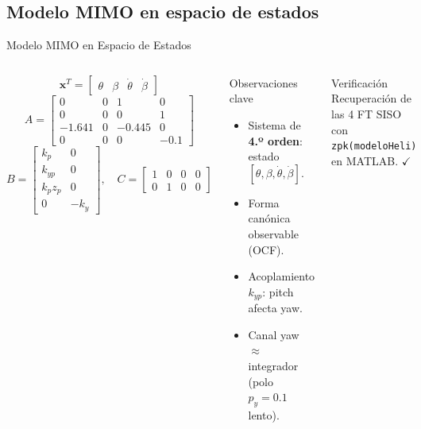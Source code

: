 \documentclass[mathserif,spanish,10pt]{beamer}
\newcommand{\good}[1]{\textcolor{passgreen}{#1}}
\begin{document}
\subsection{Modelo MIMO en espacio de estados}

\begin{frame}{Modelo MIMO en Espacio de Estados}
\begin{columns}[T]
  \vspace{-4pt}
  \[
    \mathbf{x}^T = \begin{bmatrix} \theta & \beta & \dot\theta & \dot\beta \end{bmatrix}
  \]
  \[
    A = \begin{bmatrix}
          0 & 0 & 1 & 0 \\
          0 & 0 & 0 & 1 \\
          -1.641 & 0 & -0.445 & 0 \\
          0 & 0 & 0 & -0.1
        \end{bmatrix}
  \]
  \[
    B = \begin{bmatrix}
          k_p & 0 \\
          k_{yp} & 0 \\
          k_p z_p & 0 \\
          0 & -k_y
        \end{bmatrix}, \quad
    C = \begin{bmatrix}1&0&0&0\\0&1&0&0\end{bmatrix}
  \]

  \begin{block}{Observaciones clave}
    \scriptsize
    \begin{itemize}
      \item Sistema de \textbf{4.º orden}: estado $[\theta,\beta,\dot\theta,\dot\beta]$.
      \item Forma canónica observable (OCF).
      \item Acoplamiento $k_{yp}$: pitch afecta yaw.
      \item Canal yaw $\approx$ integrador (polo $p_y=0.1$ lento).
    \end{itemize}
  \end{block}

  \begin{block}{Verificación}
    \centering\small
    Recuperación de las 4 FT SISO con\\
    \texttt{zpk(modeloHeli)} en MATLAB. \good{$\checkmark$}
  \end{block}
\end{columns}
\end{frame}
\end{document}
